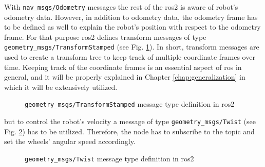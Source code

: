 With \texttt{nav\_msgs/Odometry} messages the rest of the \ac{ros2} is aware of robot's odometry data. However, in addition to odometry data, the odometry frame has to be defined as well to explain the robot's position with respect to the odometry frame. For that purpose \ac{ros2} defines transform messages of type \texttt{geometry\_msgs/TransformStamped} (see Fig. \ref{fig:simulation:transform}). In short, transform messages are used to create a transform tree to keep track of multiple coordinate frames over time. Keeping track of the coordinate frames is an essential aspect of \ac{ros} in general, and it will be properly explained in Chapter \ref{chap:generalization} in which it will be extensively utilized.

\begin{figure}[H]
    \centering
    \begin{subfigure}[b]{0.9\textwidth}
    \end{subfigure}
    \caption{\texttt{geometry\_msgs/TransformStamped} message type definition in \ac{ros2}}
    \label{fig:simulation:transform}
\end{figure}

but to control the robot's velocity a message of type \texttt{geometry\_msgs/Twist} (see Fig. \ref{fig:simulation:twist}) has to be utilized. Therefore, the node has to subscribe to the topic and set the wheels' angular speed accordingly.

\begin{figure}[H]
    \centering
    \begin{subfigure}[b]{0.9\textwidth}
    \end{subfigure}
    \caption{\texttt{geometry\_msgs/Twist} message type definition in \ac{ros2}}
    \label{fig:simulation:twist}
\end{figure}

